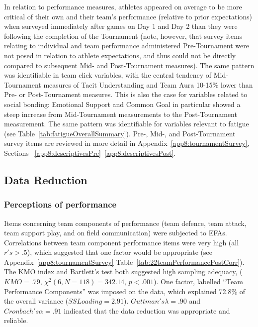 \begin{CJK}{UTF8}{gbsn}
In relation to performance measures, athletes appeared on average to be more critical of their own and their team's performance (relative to prior expectations) when surveyed immediately after games on Day 1 and Day 2 than they were following the completion of the Tournament (note, however, that survey items relating to individual and team performance administered Pre-Tournament were not posed in relation to athlete expectations, and thus could not be directly compared to subsequent Mid- and Post-Tournament measures).  The same pattern was identifiable in team click variables, with the central tendency of Mid-Tournament measures of Tacit Understanding and Team Aura 10-15\% lower than Pre- or Post-Tournament measures.  This is also the case for variables related to social bonding: Emotional Support and Common Goal in particular showed a steep increase from Mid-Tournament measurements to the Post-Tournament measurement.  The same pattern was identifiable for variables relevant to fatigue (see Table~\ref{tab:fatigueOverallSummary}).
Pre-, Mid-, and Post-Tournament survey items are reviewed in more detail in Appendix~\ref{app8:tournamentSurvey}, Sections ~\ref{app8:descriptivesPre}\nobreakdash~\ref{app8:descriptivesPost}.














\subsection{Data Reduction\label{Ch5:dataReduction}}


\subsubsection{Perceptions of performance}

Items concerning team components of performance (team defence, team attack, team support play, and on field communication) were subjected to EFAs.  Correlations between team component performance items were very high (all $r's > .5$), which suggested that one factor would be appropriate (see Appendix~\ref{app8:tournamentSurvey} Table~\ref{tab:22teamPerformancePostCorr}). The KMO index and Bartlett's test both suggested high sampling adequacy, ($KMO = .79$, $\chi^2(6, N = 118) = 342.14$, $p < .001$).  One factor, labelled ``Team Performance Components'' was imposed on the data, which explained 72.8\% of the overall variance ($SS Loading = 2.91$). $Guttman's \lambda =.90$ and $Cronbach's \alpha = .91$ indicated that the data reduction was appropriate and reliable.


\end{CJK}
